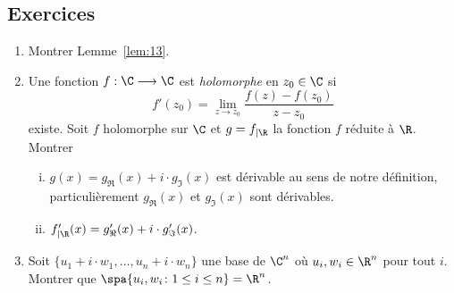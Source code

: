 





\subsection*{Exercices} 

\begin{enumerate}
\item Montrer Lemme~\ref{lem:13}. 
\item Une fonction $f:\C \longrightarrow \C$ est \emph{holomorphe} en $z_0 \in \C$ si
  \begin{displaymath}
    f'(z_0) = \lim_{z \rightarrow z_0} \frac{f(z) - f(z_0)}{z - z_0} 
  \end{displaymath}
existe. Soit $f$ holomorphe sur $\C$ et $g = f_{|\R}$ la fonction $f$ réduite à $\R$. 
 Montrer 
\begin{enumerate}[i)]
\item  $g(x) = g_\Re(x) + i \cdot g_\Im(x)$ est dérivable au  sens de notre définition, particulièrement $g_\Re(x)$ et $ g_\Im(x)$ sont dérivables. 
\item $f'_{| \R} (x) = g'_\Re(x) + i \cdot g'_\Im(x)$. 
\end{enumerate}
\item Soit $\{u_1+ i \cdot w_1,\dots,u_n + i \cdot w_n\}$ une base de $\C^n$ où $u_i,w_i \in \R^n$  pour tout $i$. Montrer que $\spa\{u_i, w_i \colon 1 \leq i \leq n\} = \R^n$. \label{item:5}
\end{enumerate}






